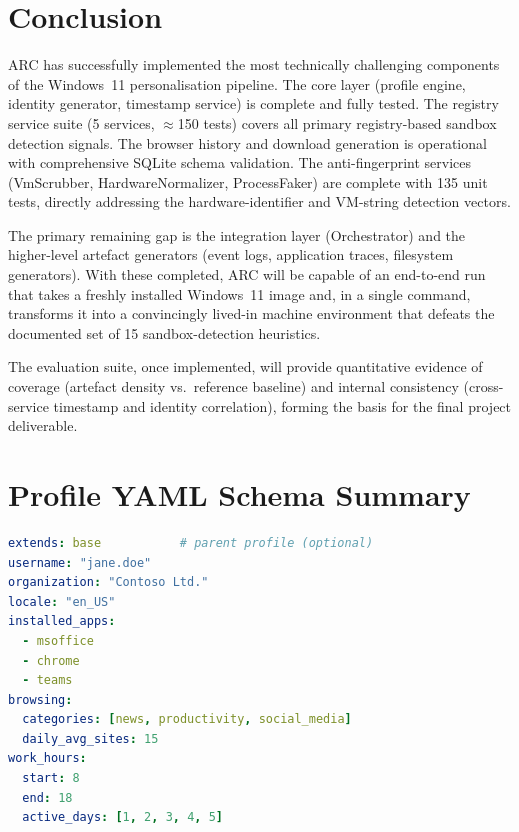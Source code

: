 \documentclass[12pt,a4paper]{article}
\begin{document}
\section{Conclusion}
\label{sec:conclusion}

ARC has successfully implemented the most technically challenging components of
the Windows~11 personalisation pipeline.  The core layer (profile engine,
identity generator, timestamp service) is complete and fully tested.  The
registry service suite (5 services, $\approx$150 tests) covers all
primary registry-based sandbox detection signals.  The browser history and
download generation is operational with comprehensive SQLite schema validation.
The anti-fingerprint services (VmScrubber, HardwareNormalizer, ProcessFaker)
are complete with 135 unit tests, directly addressing the hardware-identifier
and VM-string detection vectors.

The primary remaining gap is the integration layer (Orchestrator) and the
higher-level artefact generators (event logs, application traces, filesystem
generators).  With these completed, ARC will be capable of an end-to-end run
that takes a freshly installed Windows~11 image and, in a single command,
transforms it into a convincingly lived-in machine environment that defeats
the documented set of 15 sandbox-detection heuristics.

The evaluation suite, once implemented, will provide quantitative evidence of
coverage (artefact density vs.\ reference baseline) and internal consistency
(cross-service timestamp and identity correlation), forming the basis for the
final project deliverable.

\appendix
\section{Profile YAML Schema Summary}
\label{app:schema}

\begin{lstlisting}[language=yaml, caption={Minimal profile YAML fields.}]
extends: base           # parent profile (optional)
username: "jane.doe"
organization: "Contoso Ltd."
locale: "en_US"
installed_apps:
  - msoffice
  - chrome
  - teams
browsing:
  categories: [news, productivity, social_media]
  daily_avg_sites: 15
work_hours:
  start: 8
  end: 18
  active_days: [1, 2, 3, 4, 5]
\end{lstlisting}
\end{document}
